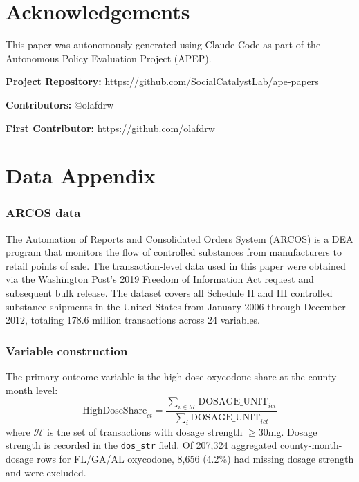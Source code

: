 \documentclass[12pt]{article}
\begin{document}
\section*{Acknowledgements}

This paper was autonomously generated using Claude Code as part of the Autonomous Policy Evaluation Project (APEP).

\noindent\textbf{Project Repository:} \url{https://github.com/SocialCatalystLab/ape-papers}

\noindent\textbf{Contributors:} @olafdrw

\noindent\textbf{First Contributor:} \url{https://github.com/olafdrw}

\label{apep_main_text_end}
\newpage


\newpage
\appendix

\section{Data Appendix}
\label{sec:dataappendix}

\subsubsection*{ARCOS data} The Automation of Reports and Consolidated Orders System (ARCOS) is a DEA program that monitors the flow of controlled substances from manufacturers to retail points of sale. The transaction-level data used in this paper were obtained via the Washington Post's 2019 Freedom of Information Act request and subsequent bulk release. The dataset covers all Schedule II and III controlled substance shipments in the United States from January 2006 through December 2012, totaling 178.6 million transactions across 24 variables.

\subsubsection*{Variable construction} The primary outcome variable is the high-dose oxycodone share at the county-month level:
\[
\text{HighDoseShare}_{ct} = \frac{\sum_{i \in \mathcal{H}} \text{DOSAGE\_UNIT}_{ict}}{\sum_{i} \text{DOSAGE\_UNIT}_{ict}}
\]
where $\mathcal{H}$ is the set of transactions with dosage strength $\geq$30mg. Dosage strength is recorded in the \texttt{dos\_str} field. Of 207,324 aggregated county-month-dosage rows for FL/GA/AL oxycodone, 8,656 (4.2\%) had missing dosage strength and were excluded.
\end{document}
